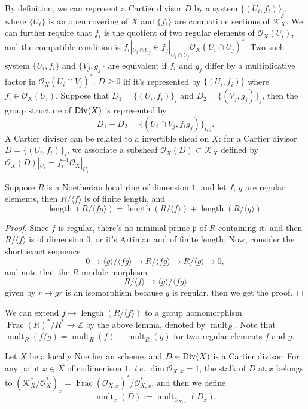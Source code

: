 By definition, we can represent a Cartier divisor $D$ by a system $\{(U_i,f_i)\}_i$, 
where $\{U_i\}$ is an open covering of $X$ and $\{f_i\}$ are compatible sections of 
$\mathcal K^*_X$. We can further require that $f_i$ is the quotient of two regular 
elements of $\mathcal O_X(U_i)$, and the compatible condition is 
$f_i|_{U_i\cap U_j}\in f_j|_{U_i\cap U_j}\mathcal O_X(U_i\cap U_j)^*$.
Two such system $\{U_i,f_i\}$ and $\{V_j,g_j\}$ are equivalent if 
$f_i$ and $g_j$ differ by a multiplicative factor in $\mathcal O_X(U_i\cap V_j)^*$.
$D\geq 0$ iff it's represented by $\{(U_i,f_i)\}$ where $f_i\in \mathcal O_X(U_i)$.
Suppose that $D_1=\{(U_i,f_i)\}_i$ and $D_2=\{(V_j,g_j)\}_j$, then the group 
structure of $\operatorname{Div}(X)$ is represented by 
\[
	D_1+D_2=\{(U_i\cap V_j,f_ig_j)\}_{i,j}.
\]
A Cartier divisor can be related to a invertible sheaf on $X$: for a Cartier divisor 
$D=\{(U_i,f_i)\}_i$, we associate a subsheaf $\mathcal O_X(D)\subset \mathcal K_X$ 
defined by $\mathcal O_X(D)|_{U_i}=f_i^{-1}\mathcal O_X|_{U_i}$

\begin{lem}
Suppose $R$ is a Noetherian local ring of dimension $1$, and let $f$, $g$ are regular
elements, then $R/\langle f\rangle$ is of finite length, and 
\[
	\operatorname{length}(R/\langle fg\rangle) =
	\operatorname{length}(R/\langle f\rangle) +
	\operatorname{length}(R/\langle g\rangle).
\]
\end{lem}

\begin{proof}
Since $f$ is regular, there's no minimal prime $\mathfrak p$ of $R$ containing it,
and then $R/\langle f\rangle$ is of dimension $0$, or it's Artinian and of finite
length. Now, consider the short exact sequence
\[
	0\to \langle g\rangle /\langle fg\rangle \to 
	R/\langle fg\rangle\to R/\langle g\rangle \to 0,
\]
and note that the $R$-module morphism 
\[
	R/\langle f\rangle \to\langle g\rangle/\langle fg\rangle
\]
given by $r\mapsto gr$ is an isomorphism because $g$ is regular, then we get the proof.
\end{proof}

We can extend $f\mapsto \operatorname{length}(R/\langle f\rangle)$ to a group 
homomorphism $\operatorname{Frac}(R)^*/R^*\to \mathbb Z$ by the above lemma, 
denoted by $\operatorname{mult}_R$. Note that $\operatorname{mult}_R(f/g)
=\operatorname{mult}_R(f)-\operatorname{mult}_R(g)$ for two regular elements $f$ and 
$g$.

Let $X$ be a locally Noetherian scheme, and $D\in \operatorname{Div}(X)$ is a Cartier divisor.
For any point $x\in X$ of codimenison $1$, \textit{i.e.} $\dim \mathcal O_{X,x}=1$,
the stalk of $D$ at $x$ belongs to $(\mathcal K^*_X/\mathcal O_X^*)_x=
\operatorname{Frac} (\mathcal O_{X,x})^*/\mathcal O_{X,x}^*$, and then we define
\[
	\operatorname{mult}_x(D):= \operatorname{mult}_{\mathcal O_{X,x}}(D_x).
\]
